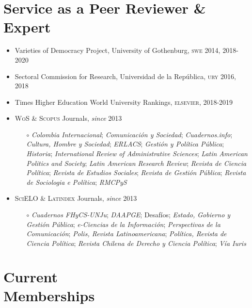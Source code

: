 \documentclass[letterpaper,margin]{res}
\begin{document}
\begin{resume}

\section{\footnotesize Service as a Peer Reviewer \& Expert}

\begin{itemize}
\item{\small Varieties of Democracy Project, University of Gothenburg, {\scshape swe} 2014, 2018-2020}
\item{\small Sectoral Commission for Research, Universidad de la Rep\'ublica, {\scshape ury} 2016, 2018}
\item{\small Times Higher Education World University Rankings, {\scshape elsevier}, 2018-2019}
\item{\small {\scshape WoS} \& {\scshape Scopus} Journals, {\itshape since} 2013}
\begin{itemize}
\item[$\circ$]{\small {\itshape Colombia Internacional}; {\itshape Comunicaci\'on y Sociedad}; {\itshape Cuadernos.info}; {\itshape Cultura, Hombre y Sociedad}; {\itshape ERLACS}; {\itshape Gesti\'on y Pol\'itica P\'ublica}; {\itshape Historia}; {\itshape International Review of Administrative Sciences}; {\itshape Latin American Politics and Society}; {\itshape Latin American Research Review}; {\itshape Revista de Ciencia Pol\'itica}; {\itshape Revista de Estudios Sociales}; {\itshape Revista de Gesti\'on P\'ublica}; {\itshape Revista de Sociologia e Pol\'itica}; {\itshape RMCPyS}}
\end{itemize}
\item{\small {\scshape SciELO} \& {\scshape Latindex} Journals, {\itshape since} 2013}
\begin{itemize}
\item[$\circ$]{\small {\itshape Cuadernos FHyCS-UNJu}; {\itshape DAAPGE}; {Desaf\'ios}; {\itshape Estado, Gobierno y Gesti\'on P\'ublica}; {\itshape e-Ciencias de la Informaci\'on}; {\itshape Perspectivas de la Comunicaci\'on}; {\itshape Polis, Revista Latinoamericana}; {\itshape Pol\'itica, Revista de Ciencia Pol\'itica}; {\itshape Revista Chilena de Derecho y Ciencia Pol\'itica}; {\itshape V\'ia Iuris}}
\end{itemize}
\end{itemize}


\section{\footnotesize Current \\ Memberships}


\end{resume}
\end{document}
